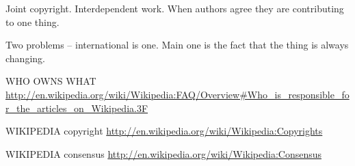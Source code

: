 Joint copyright. Interdependent work. When authors agree they are
contributing to one thing.

Two problems -- international is one. Main one is the fact that the
thing is always changing.

WHO OWNS WHAT
\url{http://en.wikipedia.org/wiki/Wikipedia:FAQ/Overview#Who_is_responsible_for_the_articles_on_Wikipedia.3F}

WIKIPEDIA copyright
\url{http://en.wikipedia.org/wiki/Wikipedia:Copyrights}

WIKIPEDIA consensus
\url{http://en.wikipedia.org/wiki/Wikipedia:Consensus}
